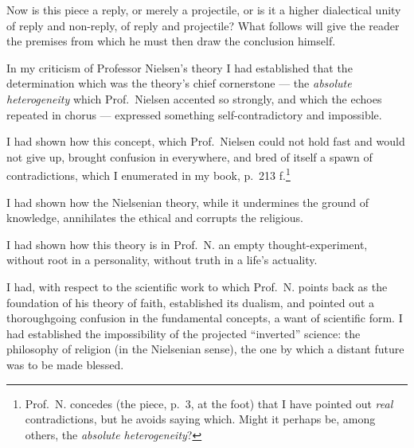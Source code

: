 \documentclass[12pt,a4paper]{book}
\begin{document}
\setcounter{footnote}{0}
Now is this piece a reply, or merely a projectile, or is it a higher
dialectical unity of reply and non-reply, of reply and projectile? What follows
will give the reader the premises from which he must then draw the conclusion
himself.

In my criticism of Professor Nielsen's theory I had established that the
determination which was the theory's chief cornerstone --- the \emph{absolute
heterogeneity} which Prof.\ Nielsen accented so strongly, and which the echoes
repeated in chorus --- expressed something self-contradictory and impossible.

I had shown how this concept, which Prof.\ Nielsen could not hold fast and
would not give up, brought confusion in everywhere, and bred of itself a spawn
of contradictions, which I enumerated in my book, p.\ 213 f.\footnote{%
  Prof.\ N. concedes (the piece, p.\ 3, at the foot) that I have pointed out
  \emph{real} contradictions, but he avoids saying which. Might it perhaps be,
  among others, the \emph{absolute heterogeneity}?}

I had shown how the Nielsenian theory, while it undermines the ground of
knowledge, annihilates the ethical and corrupts the religious.

I had shown how this theory is in Prof.\ N. an empty thought-experiment,
without root in a personality, without truth in a life's actuality.

I had, with respect to the scientific work to which Prof.\ N. points back as
the foundation of his theory of faith, established its dualism, and pointed out
a thoroughgoing confusion in the fundamental concepts, a want of scientific
form. I had established the impossibility of the projected ``inverted''
science: the philosophy of religion (in the Nielsenian sense), the one by which
a distant future was to be made blessed.
\end{document}
